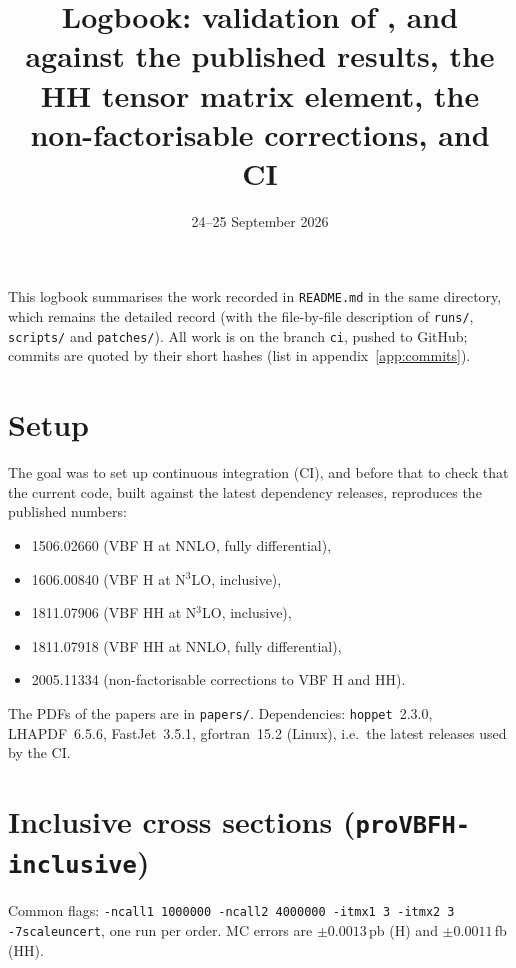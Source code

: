 \documentclass[11pt,a4paper]{article}
\title{Logbook: validation of \provbfh, \provbfhh and \provbfhinc against
  the published results, the HH tensor matrix element, the
  non-factorisable corrections, and CI}
\author{}
\date{24--25 September 2026}
\newcommand{\provbfhinc}{\texttt{proVBFH-inclusive}\xspace}
\newcommand{\hoppet}{\texttt{hoppet}\xspace}
\newcommand{\file}[1]{\texttt{#1}}
\begin{document}
\maketitle

\noindent This logbook summarises the work recorded in \file{README.md}
in the same directory, which remains the detailed record (with the
file-by-file description of \file{runs/}, \file{scripts/} and
\file{patches/}). All work is on the branch \texttt{ci}, pushed to
GitHub; commits are quoted by their short hashes (list in
appendix~\ref{app:commits}).

\tableofcontents

\section{Setup}

The goal was to set up continuous integration (CI), and before that to
check that the current code, built against the latest dependency
releases, reproduces the published numbers:
\begin{itemize}
\item 1506.02660 (VBF H at NNLO, fully differential),
\item 1606.00840 (VBF H at N$^3$LO, inclusive),
\item 1811.07906 (VBF HH at N$^3$LO, inclusive),
\item 1811.07918 (VBF HH at NNLO, fully differential),
\item 2005.11334 (non-factorisable corrections to VBF H and HH).
\end{itemize}
The PDFs of the papers are in \file{papers/}. Dependencies:
\hoppet~2.3.0, LHAPDF~6.5.6, FastJet~3.5.1, gfortran~15.2 (Linux),
i.e.\ the latest releases used by the CI.

\section{\texorpdfstring{Inclusive cross sections (\provbfhinc)}{Inclusive cross sections (proVBFH-inclusive)}}

Common flags: \texttt{-ncall1 1000000 -ncall2 4000000 -itmx1 3 -itmx2 3
  -7scaleuncert}, one run per order. MC errors are $\pm0.0013$\,pb (H)
and $\pm0.0011$\,fb (HH).
\end{document}

